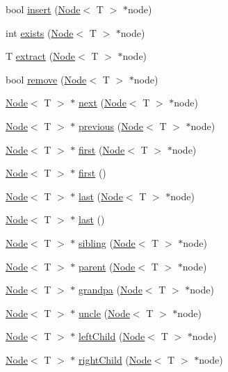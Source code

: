 \begin{DoxyCompactItemize}
\item 
bool \hyperlink{class_r_b_tree_a8f67ba964a14d252ff6851a46576399e}{insert} (\hyperlink{class_node}{Node}$<$ T $>$ $\ast$node)
\item 
int \hyperlink{class_r_b_tree_a02ef14a5c193082579beff0e00751c41}{exists} (\hyperlink{class_node}{Node}$<$ T $>$ $\ast$node)
\item 
T \hyperlink{class_r_b_tree_a3b2a1009c457ba28fffea83197d715b6}{extract} (\hyperlink{class_node}{Node}$<$ T $>$ $\ast$node)
\item 
bool \hyperlink{class_r_b_tree_ab5a8279632f153fd1e68d1f2caaabe58}{remove} (\hyperlink{class_node}{Node}$<$ T $>$ $\ast$node)
\item 
\hyperlink{class_node}{Node}$<$ T $>$ $\ast$ \hyperlink{class_r_b_tree_ac40b7ce97f66186cb7a1dfe988059bd5}{next} (\hyperlink{class_node}{Node}$<$ T $>$ $\ast$node)
\item 
\hyperlink{class_node}{Node}$<$ T $>$ $\ast$ \hyperlink{class_r_b_tree_a16156805af6fc45a834db9b13a7137d1}{previous} (\hyperlink{class_node}{Node}$<$ T $>$ $\ast$node)
\item 
\hyperlink{class_node}{Node}$<$ T $>$ $\ast$ \hyperlink{class_r_b_tree_a0039ecd4c4a9999f2e63689a5bd8311e}{first} (\hyperlink{class_node}{Node}$<$ T $>$ $\ast$node)
\item 
\hyperlink{class_node}{Node}$<$ T $>$ $\ast$ \hyperlink{class_r_b_tree_a3cd9a4d0626aacc83b928b8cfcae2343}{first} ()
\item 
\hyperlink{class_node}{Node}$<$ T $>$ $\ast$ \hyperlink{class_r_b_tree_a876cdcefe3be45bd7590e18ce13ac9a4}{last} (\hyperlink{class_node}{Node}$<$ T $>$ $\ast$node)
\item 
\hyperlink{class_node}{Node}$<$ T $>$ $\ast$ \hyperlink{class_r_b_tree_a9ec1524fd304ab708864f3ed5929fde4}{last} ()
\item 
\hyperlink{class_node}{Node}$<$ T $>$ $\ast$ \hyperlink{class_r_b_tree_abd85da46c4bb99c2e2f0086b71990e86}{sibling} (\hyperlink{class_node}{Node}$<$ T $>$ $\ast$node)
\item 
\hyperlink{class_node}{Node}$<$ T $>$ $\ast$ \hyperlink{class_r_b_tree_a0600be3a5c7d75359a63c8d19dc175ed}{parent} (\hyperlink{class_node}{Node}$<$ T $>$ $\ast$node)
\item 
\hyperlink{class_node}{Node}$<$ T $>$ $\ast$ \hyperlink{class_r_b_tree_abb9bd44c3ad32f37f072ae19f3183d8b}{grandpa} (\hyperlink{class_node}{Node}$<$ T $>$ $\ast$node)
\item 
\hyperlink{class_node}{Node}$<$ T $>$ $\ast$ \hyperlink{class_r_b_tree_afad4eef004c3b4ed37fe1ee89f95da54}{uncle} (\hyperlink{class_node}{Node}$<$ T $>$ $\ast$node)
\item 
\hyperlink{class_node}{Node}$<$ T $>$ $\ast$ \hyperlink{class_r_b_tree_aaf6d97fec88a9168eaad604a2ae12efe}{left\+Child} (\hyperlink{class_node}{Node}$<$ T $>$ $\ast$node)
\item 
\hyperlink{class_node}{Node}$<$ T $>$ $\ast$ \hyperlink{class_r_b_tree_a1dfb71e17e463bf14a112698242c7490}{right\+Child} (\hyperlink{class_node}{Node}$<$ T $>$ $\ast$node)
\end{DoxyCompactItemize}


